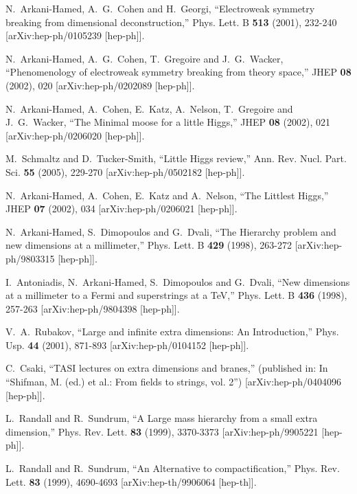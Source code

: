 \documentclass[12pt]{article}
\numberwithin{equation}{section}
\begin{document}
\begin{thebibliography}{999}
N.~Arkani-Hamed, A.~G.~Cohen and H.~Georgi,
``Electroweak symmetry breaking from dimensional deconstruction,''
Phys. Lett. B \textbf{513} (2001), 232-240
[arXiv:hep-ph/0105239 [hep-ph]].

N.~Arkani-Hamed, A.~G.~Cohen, T.~Gregoire and J.~G.~Wacker,
``Phenomenology of electroweak symmetry breaking from theory space,''
JHEP \textbf{08} (2002), 020
[arXiv:hep-ph/0202089 [hep-ph]].

N.~Arkani-Hamed, A.~Cohen, E.~Katz, A.~Nelson, T.~Gregoire and J.~G.~Wacker,
``The Minimal moose for a little Higgs,''
JHEP \textbf{08} (2002), 021
[arXiv:hep-ph/0206020 [hep-ph]].

M.~Schmaltz and D.~Tucker-Smith,
``Little Higgs review,''
Ann. Rev. Nucl. Part. Sci. \textbf{55} (2005), 229-270
[arXiv:hep-ph/0502182 [hep-ph]].

N.~Arkani-Hamed, A.~Cohen, E.~Katz and A.~Nelson,
``The Littlest Higgs,'' JHEP \textbf{07} (2002), 034 [arXiv:hep-ph/0206021 [hep-ph]].

N.~Arkani-Hamed, S.~Dimopoulos and G.~Dvali,
``The Hierarchy problem and new dimensions at a millimeter,'' Phys. Lett. B \textbf{429} (1998), 263-272
[arXiv:hep-ph/9803315 [hep-ph]].

I.~Antoniadis, N.~Arkani-Hamed, S.~Dimopoulos and G.~Dvali,
``New dimensions at a millimeter to a Fermi and superstrings at a TeV,''
Phys. Lett. B \textbf{436} (1998), 257-263 [arXiv:hep-ph/9804398 [hep-ph]].

V.~A.~Rubakov,
``Large and infinite extra dimensions: An Introduction,''
Phys. Usp. \textbf{44} (2001), 871-893
[arXiv:hep-ph/0104152 [hep-ph]].

C.~Csaki,
``TASI lectures on extra dimensions and branes,'' (published in: In ``Shifman, M. (ed.) et al.: From fields to strings, vol. 2'') [arXiv:hep-ph/0404096 [hep-ph]].

L.~Randall and R.~Sundrum,
``A Large mass hierarchy from a small extra dimension,''
Phys. Rev. Lett. \textbf{83} (1999), 3370-3373
[arXiv:hep-ph/9905221 [hep-ph]].

L.~Randall and R.~Sundrum,
``An Alternative to compactification,''
Phys. Rev. Lett. \textbf{83} (1999), 4690-4693
[arXiv:hep-th/9906064 [hep-th]].


\end{thebibliography}
\end{document}
